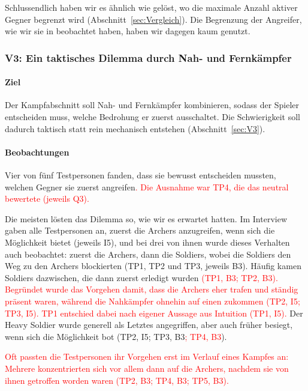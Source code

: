 \documentclass[../Main.tex]{subfiles}
\begin{document}
Schlussendlich haben wir es ähnlich wie  gelöst, wo die maximale Anzahl aktiver Gegner begrenzt wird (Abschnitt~\ref{sec:Vergleich}). Die Begrenzung der Angreifer, wie wir sie in  beobachtet haben, haben wir dagegen kaum genutzt.

\subsubsection{V3: Ein taktisches Dilemma durch Nah- und Fernkämpfer}

\paragraph{Ziel}
Der Kampfabschnitt soll Nah- und Fernkämpfer kombinieren, sodass der Spieler entscheiden muss, welche Bedrohung er zuerst ausschaltet. Die Schwierigkeit soll dadurch taktisch statt rein mechanisch entstehen (Abschnitt~\ref{sec:V3}).

\paragraph{Beobachtungen}
Vier von fünf Testpersonen fanden, dass sie bewusst entscheiden mussten, welchen Gegner sie zuerst angreifen\textcolor{red}{. Die Ausnahme war TP4, die das neutral bewertete (jeweils Q3).}

Die meisten lösten das Dilemma so, wie wir es erwartet hatten. Im Interview gaben alle Testpersonen an, zuerst die Archers anzugreifen, wenn sich die Möglichkeit bietet (jeweils I5), und bei drei von ihnen wurde dieses Verhalten auch beobachtet: zuerst die Archers, dann die Soldiers, wobei die Soldiers den Weg zu den Archers blockierten (TP1, TP2 und TP3, jeweils B3). Häufig kamen Soldiers dazwischen, die dann zuerst erledigt wurden\textcolor{red}{ (TP1, B3; TP2, B3). Begründet wurde das Vorgehen damit, dass die Archers eher trafen und ständig präsent waren, während die Nahkämpfer ohnehin auf einen zukommen (TP2, I5; TP3, I5). TP1 entschied dabei nach eigener Aussage aus Intuition (TP1, I5).} Der Heavy Soldier wurde generell als Letztes angegriffen, aber auch früher besiegt, wenn sich die Möglichkeit bot (TP2, I5; TP3, B3\textcolor{red}{; TP4, B3}).

\textcolor{red}{Oft passten die Testpersonen ihr Vorgehen erst im Verlauf eines Kampfes an: Mehrere konzentrierten sich vor allem dann auf die Archers, nachdem sie von ihnen getroffen worden waren (TP2, B3; TP4, B3; TP5, B3).}
\end{document}
